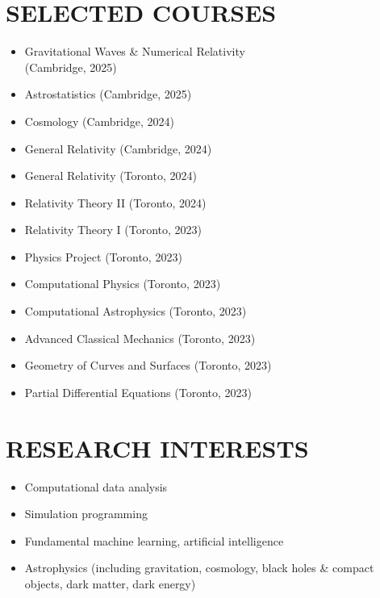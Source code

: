 \documentclass[a4paper,10pt]{extarticle}
\begin{document}
\newpage

\section*{SELECTED COURSES}
\begin{multicols}{2}
\begin{itemize}
    \item Gravitational Waves \& Numerical Relativity \\(Cambridge, 2025)
    \item Astrostatistics (Cambridge, 2025)
    \item Cosmology (Cambridge, 2024)
    \item General Relativity (Cambridge, 2024)
    \item General Relativity (Toronto, 2024)
    \item Relativity Theory II (Toronto, 2024)
    \item Relativity Theory I (Toronto, 2023)
    \item Physics Project (Toronto, 2023)
    \item Computational Physics (Toronto, 2023)
    \item Computational Astrophysics (Toronto, 2023)
    \item Advanced Classical Mechanics (Toronto, 2023)
    \item Geometry of Curves and Surfaces (Toronto, 2023)
    \item Partial Differential Equations (Toronto, 2023)
\end{itemize}
\end{multicols}

\section*{RESEARCH INTERESTS}
\begin{itemize}
    \item Computational data analysis

    \item Simulation programming

    \item Fundamental machine learning, artificial intelligence
    
    \item Astrophysics (including gravitation, cosmology, black holes \& compact objects, dark matter, dark energy)
\end{itemize}
\end{document}
